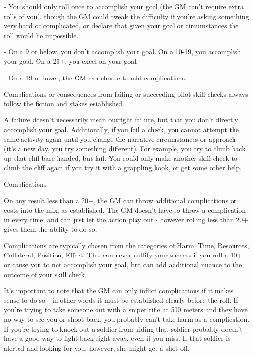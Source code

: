     -    You should only roll once to accomplish your goal (the GM can’t require extra rolls of  
         you), though the GM could tweak the difficulty if you’re asking something very hard or  
         complicated, or declare that given your goal or circumstances the roll would be  
         impossible.
 
    -    On a 9 or below, you don’t accomplish your goal. On a 10-19, you accomplish your goal.  
         On a 20+, you excel on your goal.
 
    -    On a 19 or lower, the GM can choose to add complications.
 

Complications or consequences from failing or succeeding pilot skill checks always follow the  
fiction and stakes established.
 

A failure doesn’t necessarily mean outright failure, but that you don’t directly accomplish your  
goal. Additionally, if you fail a check, you cannot attempt the same activity again until you change  
the narrative circumstances or approach (it’s a new day, you try something different). For  
example, you try to climb back up that cliff bare-handed, but fail. You could only make another  
skill check to climb the cliff again if you try it with a grappling hook, or get some other help.
 

                                                 Complications  

On any result less than a 20+, the GM can throw additional complications or costs into the mix,  
as established. The GM doesn’t have to throw a complication in every time, and can just let the  
action play out - however rolling less than 20+ gives them the ability to do so.
 

Complications are typically chosen from the categories of Harm, Time, Resources, Collateral,  
Position, Effect. This can never nullify your success if you roll a 10+ or cause you to not  
accomplish your goal, but can add additional nuance to the outcome of your skill check. 
 

It’s important to note that the GM can only inflict complications if it makes sense to do so - in  
other words it must be established clearly before the roll. If you’re trying to take someone out  
with a sniper rifle at 500 meters and they have no way to see you or shoot back, you probably  
can’t take harm as a complication. If you’re trying to knock out a soldier from hiding that soldier  
probably doesn’t have a good way to fight back right away, even if you miss. If that soldier is  
alerted and looking for you, however, she might get a shot off.
 

